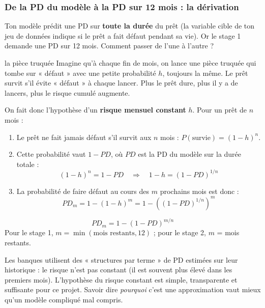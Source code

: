 \subsubsection{De la PD du modèle à la PD sur 12 mois : la dérivation}

Ton modèle prédit une PD sur \textbf{toute la durée} du prêt (la variable cible de ton jeu de données
indique si le prêt a fait défaut pendant sa vie). Or le stage 1 demande une PD sur 12 mois. Comment
passer de l'une à l'autre ?

\begin{analogie}{la pièce truquée}
Imagine qu'à chaque fin de mois, on lance une pièce truquée qui tombe sur « défaut » avec une petite
probabilité $h$, toujours la même. Le prêt survit s'il évite « défaut » à chaque lancer. Plus le prêt
dure, plus il y a de lancers, plus le risque cumulé augmente.
\end{analogie}

On fait donc l'hypothèse d'un \textbf{risque mensuel constant} $h$. Pour un prêt de $n$ mois :
\begin{enumerate}
\item Le prêt ne fait jamais défaut s'il survit aux $n$ mois : $P(\text{survie}) = (1-h)^n$.
\item Cette probabilité vaut $1 - PD$, où $PD$ est la PD du modèle sur la durée totale :
\[ (1-h)^n = 1 - PD \quad\Longrightarrow\quad 1 - h = (1 - PD)^{1/n} \]
\item La probabilité de faire défaut au cours des $m$ prochains mois est donc :
\[ PD_m = 1 - (1-h)^m = 1 - \left((1 - PD)^{1/n}\right)^m \]
\end{enumerate}
\[
\boxed{\;PD_m = 1 - (1 - PD)^{m/n}\;}
\]
Pour le stage 1, $m = \min(\text{mois restants}, 12)$ ; pour le stage 2, $m$ = mois restants.

\begin{observation}
Les banques utilisent des « structures par terme » de PD estimées sur leur historique : le risque n'est
pas constant (il est souvent plus élevé dans les premiers mois). L'hypothèse du risque constant est
simple, transparente et suffisante pour ce projet. Savoir dire \emph{pourquoi} c'est une approximation
vaut mieux qu'un modèle compliqué mal compris.
\end{observation}

